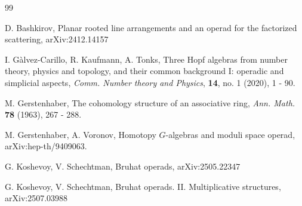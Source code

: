 \documentclass[12pt,a4paper]{article}
\begin{document}
\begin{thebibliography}{99}
 
 
  


 D. Bashkirov, Planar rooted line arrangements and an operad for the factorized scattering, arXiv:2412.14157

 I. G\`alvez-Carillo, R. Kaufmann, A. Tonks,  Three Hopf algebras from 
number theory, physics and topology, and their common background I: operadic and simplicial 
aspects, {\it Comm. Number theory and Physics}, {\bf 14}, no. 1 (2020), 1 - 90. 

 M. Gerstenhaber, The cohomology structure of an associative ring, 
{\em Ann. Math.} {\bf 78} (1963), 267 - 288.

 M. Gerstenhaber, A. Voronov, Homotopy $G$-algebras and moduli space operad, 
arXiv:hep-th/9409063.

 G. Koshevoy, V. Schechtman, Bruhat operads, arXiv:2505.22347

 G. Koshevoy, V. Schechtman, Bruhat operads. II. Multiplicative structures, arXiv:2507.03988



\end{thebibliography}
\end{document}
